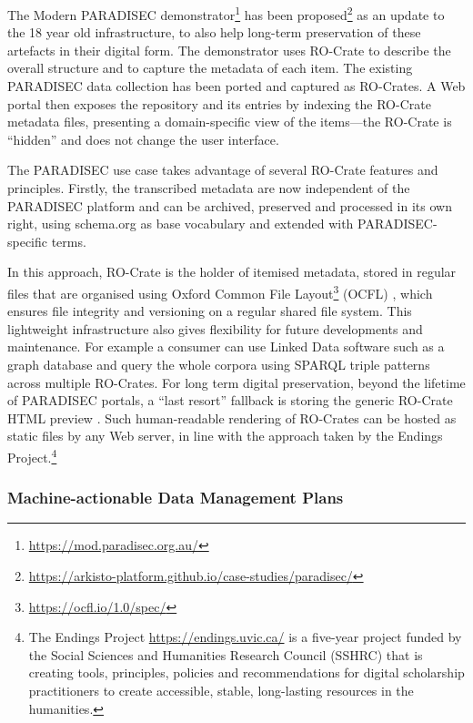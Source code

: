 The Modern PARADISEC demonstrator\footnote{\url{https://mod.paradisec.org.au/}} has
been
proposed\footnote{\url{https://arkisto-platform.github.io/case-studies/paradisec/}}
as an update to the 18 year old infrastructure, to also help long-term
preservation of these artefacts in their digital form. The demonstrator
uses RO-Crate to describe the overall structure and to capture the
metadata of each item. The existing PARADISEC data collection has been
ported and captured as RO-Crates. A Web portal then exposes the
repository and its entries by indexing the RO-Crate metadata files,
presenting a domain-specific view of the items---the RO-Crate is
``hidden'' and does not change the user interface.


The PARADISEC use case takes advantage of several RO-Crate features and
principles. Firstly, the transcribed metadata are now independent of the
PARADISEC platform and can be archived, preserved and processed in its
own right, using schema.org as base vocabulary and extended with
PARADISEC-specific terms.

In this approach, RO-Crate is the holder of itemised metadata, stored in
regular files that are organised using
Oxford Common File
Layout\footnote{\url{https://ocfl.io/1.0/spec/}} (OCFL)
\cite{OCFL 2020}, which ensures file integrity
and versioning on a regular shared file system. This lightweight
infrastructure also gives flexibility for future developments and
maintenance. For example a consumer can use Linked Data software such as
a graph database and query the whole corpora using SPARQL triple
patterns across multiple RO-Crates. For long term digital preservation,
beyond the lifetime of PARADISEC portals, a ``last resort'' fallback is
storing the generic RO-Crate \acrshort{HTML} preview
\cite{ro-crate-html-js}. Such
human-readable rendering of RO-Crates can be hosted as static files by
any Web server, in line with the approach taken by the Endings
Project.\footnote{The Endings Project \url{https://endings.uvic.ca/} 
  is a five-year project funded by the Social Sciences and Humanities
  Research Council (SSHRC) that is creating tools, principles, policies
  and recommendations for digital scholarship practitioners to create
  accessible, stable, long-lasting resources in the humanities.}

\subsubsection{Machine-actionable Data Management Plans}\label{ch5:dmp}

